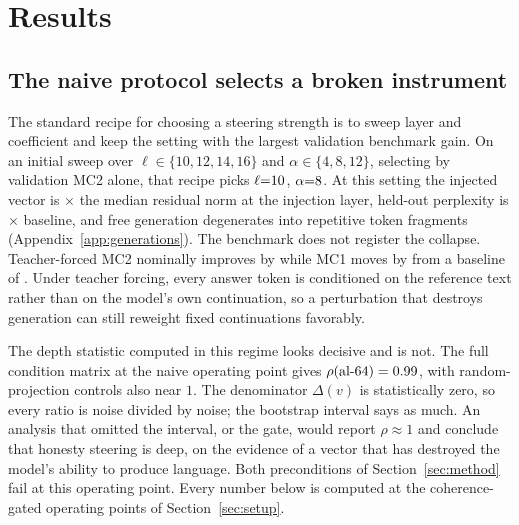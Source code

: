 \section{Results}\label{sec:results}

\subsection{The naive protocol selects a broken instrument}\label{sec:broken}

The standard recipe for choosing a steering strength is to sweep layer and coefficient and keep the setting with the largest validation benchmark gain. On an initial sweep over $\ell \in \{10, 12, 14, 16\}$ and $\alpha \in \{4, 8, 12\}$, selecting by validation MC2 alone, that recipe picks $\ell{=}10$, $\alpha{=}8$. At this setting the injected vector is \NaiveNormRatio$\times$ the median residual norm at the injection layer, held-out perplexity is \NaivePplRatio$\times$ baseline, and free generation degenerates into repetitive token fragments (Appendix~\ref{app:generations}). The benchmark does not register the collapse. Teacher-forced MC2 nominally improves by \NaiveDecDelta{} \NaiveDecDeltaCI{} while MC1 moves by \NaiveDecDeltaMcOne{} \NaiveDecDeltaMcOneCI{} from a baseline of \BaseMcOne. Under teacher forcing, every answer token is conditioned on the reference text rather than on the model's own continuation, so a perturbation that destroys generation can still reweight fixed continuations favorably.

The depth statistic computed in this regime looks decisive and is not. The full condition matrix at the naive operating point gives $\rho(\text{al-64}) = 0.99$, with random-projection controls also near $1$. The denominator $\Delta(v)$ is statistically zero, so every ratio is noise divided by noise; the bootstrap interval \NaiveRhoAlSixtyFourCI{} says as much. An analysis that omitted the interval, or the gate, would report $\rho \approx 1$ and conclude that honesty steering is deep, on the evidence of a vector that has destroyed the model's ability to produce language. Both preconditions of Section~\ref{sec:method} fail at this operating point. Every number below is computed at the coherence-gated operating points of Section~\ref{sec:setup}.

\begin{table}[t]
\centering
\small

\caption{Headline condition matrix on the \NTest{} held-out test questions; the shared unsteered baseline has MC2 $= \BaseMcTwo$. $\rho$ is the fraction of the family's own steering effect that survives each projection, with paired-bootstrap 95\% intervals. CAA's denominator is not bounded away from zero (its $\Delta$MC2 interval \DecTestDeltaCI{} contains zero), so its $\rho$ column is reported for completeness but is not interpreted; percentile intervals for a ratio are not valid confidence sets in that regime. The mass-mean denominator is bounded away from zero ($\Delta$MC2 \MmTestDelta{} \MmTestDeltaCI), and its $\rho$ values carry the central result. Figure~\ref{fig:forest} plots the same matrix as paired deltas.}
\label{tab:matrix}
\end{table}

